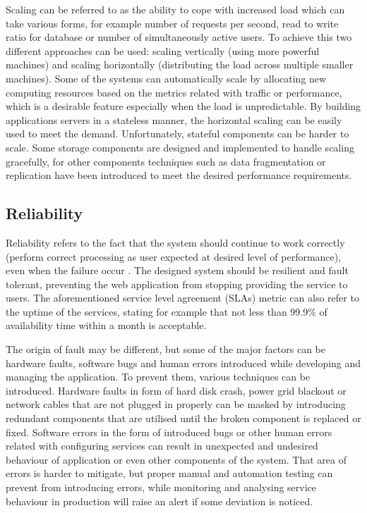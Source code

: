 Scaling can be referred to as the ability to cope with increased load which can take various forms, for example number of requests per second, read to write ratio for database or number of simultaneously active users. To achieve this two different approaches can be used: scaling vertically (using more powerful machines) and scaling horizontally (distributing the load across multiple smaller machines). Some of the systems can automatically scale by allocating new computing resources based on the metrics related with traffic or performance, which is a desirable feature especially when the load is unpredictable. By building applications servers in a stateless manner, the horizontal scaling can be easily used to meet the demand. Unfortunately, stateful components can be harder to scale. Some storage components are designed and implemented to handle scaling gracefully, for other components techniques such as data fragmentation or replication have been introduced to meet the desired performance requirements.

\subsection*{Reliability}

Reliability refers to the fact that the system should continue to work correctly (perform correct processing as user expected at desired level of performance), even when the failure occur \cite{DesignDataIntensiveApplications}. The designed system should be resilient and fault tolerant, preventing the web application from stopping providing the service to users. The aforementioned service level agreement (SLAs) metric can also refer to the uptime of the services, stating for example that not less than 99.9\% of availability time within a month is acceptable.

The origin of fault may be different, but some of the major factors can be hardware faults, software bugs and human errors introduced while developing and managing the application. To prevent them, various techniques can be introduced. Hardware faults in form of hard disk crash, power grid blackout or network cables that are not plugged in properly can be masked by introducing redundant components that are utilised until the broken component is replaced or fixed. Software errors in the form of introduced bugs or other human errors related with configuring services can result in unexpected and undesired behaviour of application or even other components of the system. That area of errors is harder to mitigate, but proper manual and automation testing can prevent from introducing errors, while monitoring and analysing service behaviour in production will raise an alert if some deviation is noticed.

